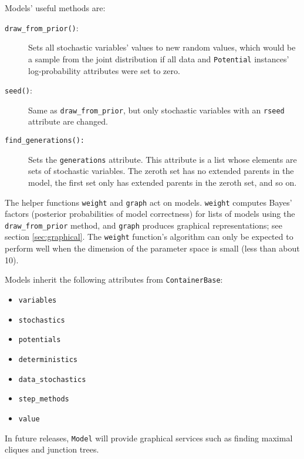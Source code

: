 Models' useful methods are:
\begin{description}
    \item[\texttt{draw_from_prior()}:] Sets all stochastic variables' values to new random values, which would be a sample from the joint distribution if all data and \texttt{Potential} instances' log-probability attributes were set to zero.
    \item[\texttt{seed()}:] Same as \texttt{draw_from_prior}, but only stochastic variables with an \texttt{rseed} attribute are changed.
    \item[\texttt{find_generations():}] Sets the \texttt{generations} attribute. This attribute is a list whose elements are sets of stochastic variables. The zeroth set has no extended parents in the model, the first set only has extended parents in the zeroth set, and so on.
\end{description}

The helper functions \texttt{weight} and \texttt{graph} act on models. \texttt{weight} computes Bayes' factors (posterior probabilities of model correctness) for lists of models using the \texttt{draw_from_prior} method, and \texttt{graph} produces graphical representations; see section \ref{sec:graphical}. The \texttt{weight} function's algorithm can only be expected to perform well when the dimension of the parameter space is small (less than about 10).

Models inherit the following attributes from \texttt{ContainerBase}:
\begin{itemize}
    \item \texttt{variables}
    \item \texttt{stochastics}
    \item \texttt{potentials}
    \item \texttt{deterministics}
    \item \texttt{data_stochastics}
    \item \texttt{step_methods}
    \item \texttt{value}
\end{itemize}


In future releases, \texttt{Model} will provide graphical services such as finding maximal cliques and junction trees.


